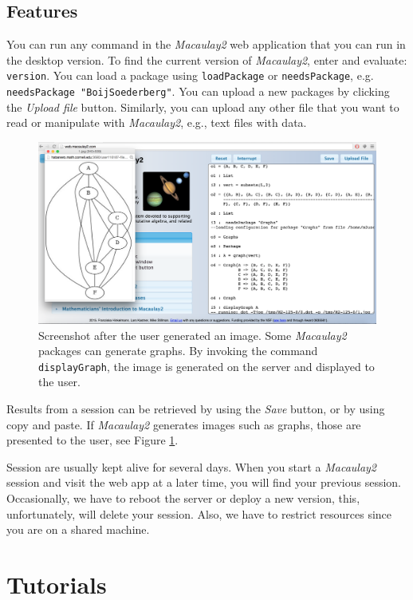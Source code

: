 \documentclass[twocolumn]{article}
\def\M2{{\it Macaulay2}}
\begin{document}
\subsection{Features}
You can run any command in the \M2 web application that you can run in the desktop version.
To find the current version of \M2,
enter and evaluate: {\tt version}.  You can load a package
 using {\tt loadPackage} or {\tt needsPackage}, e.g. {\tt needsPackage "BoijSoederberg"}.  
You can upload a new packages by clicking the {\it Upload file}
button. Similarly, you can upload any other file that you want to 
read or manipulate with \M2, e.g., text files with data. 

\begin{figure}[htb]
    \includegraphics[width=.95\textwidth]{withGraph.jpg}
    \caption{Screenshot after the user
      generated an image. Some \M2 packages can generate
      graphs. By invoking the command {\tt displayGraph}, the image is
      generated on the server and displayed to the user.}
    \label{fig:graph}
\end{figure}

Results from a session can be retrieved by using the {\it Save}
button, or by using copy and paste. If \M2 generates
images such as graphs, those are presented to the user, see Figure \ref{fig:graph}.


Session are usually kept alive for several days. When you start a \M2 session and visit the web app at a later time, 
you will find your previous session. Occasionally, 
we have to reboot the server or deploy a new version, this, 
unfortunately, will delete your session. Also, we have to restrict resources since you are on a shared machine.

\section{Tutorials}
\end{document}
